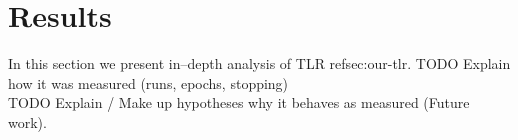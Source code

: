 

\section{Results} 
\label{sec:analysis}
\label{sec:results} 

In this section we present in--depth analysis of TLR ref{sec:our-tlr}.  
TODO Explain how it was measured (runs, epochs, stopping) \\
TODO Explain / Make up hypotheses why it behaves as measured (Future work). \\

 

 

 

 

